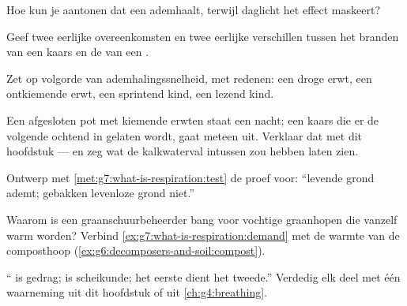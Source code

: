 \begin{exercise}[$\star$]\label{exo:g7:what-is-respiration:6}
Hoe kun je aantonen dat een  ademhaalt, terwijl daglicht het effect
maskeert?
\end{exercise}

\begin{exercise}[$\star\star$]\label{exo:g7:what-is-respiration:7}
Geef twee eerlijke overeenkomsten en twee eerlijke verschillen tussen het
branden van een kaars en de  van een .
\end{exercise}

\begin{exercise}[$\star\star$]\label{exo:g7:what-is-respiration:8}
Zet op volgorde van ademhalingssnelheid, met redenen: een droge erwt, een
ontkiemende erwt, een sprintend kind, een lezend kind.
\end{exercise}

\begin{exercise}[$\star\star$]\label{exo:g7:what-is-respiration:9}
Een afgesloten pot met kiemende erwten staat een nacht; een kaars die er
de volgende ochtend in gelaten wordt, gaat meteen uit. Verklaar dat met
dit hoofdstuk --- en zeg wat de kalkwaterval intussen zou hebben laten
zien.
\end{exercise}

\begin{exercise}[$\star\star$]\label{exo:g7:what-is-respiration:10}
Ontwerp met \cref{met:g7:what-is-respiration:test} de proef voor:
``levende grond ademt; gebakken levenloze grond niet.''
\end{exercise}

\begin{exercise}[$\star\star$]\label{exo:g7:what-is-respiration:11}
Waarom is een graanschuurbeheerder bang voor vochtige graanhopen die
vanzelf warm worden? Verbind \cref{ex:g7:what-is-respiration:demand} met
de warmte van de composthoop
(\cref{ex:g6:decomposers-and-soil:compost}).
\end{exercise}

\begin{exercise}[$\star\star\star$]\label{exo:g7:what-is-respiration:12}
`` is gedrag;  is scheikunde; het eerste dient het
tweede.'' Verdedig elk deel met één waarneming uit dit hoofdstuk of uit
\cref{ch:g4:breathing}.
\end{exercise}

